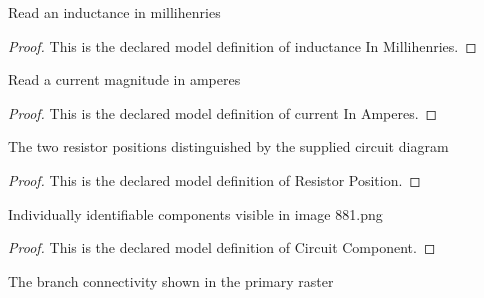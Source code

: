 \begin{definition}
  \label{def:physics:phyx-mini-0881:phyxminiproblems-problemphyxmini0881-inductanceinmillihenries}
  Read an inductance in millihenries
\end{definition}
\begin{proof}
  This is the declared model definition of inductance In Millihenries.
\end{proof}
\begin{definition}
  \label{def:physics:phyx-mini-0881:phyxminiproblems-problemphyxmini0881-currentinamperes}
  Read a current magnitude in amperes
\end{definition}
\begin{proof}
  This is the declared model definition of current In Amperes.
\end{proof}
\begin{definition}
  \label{def:physics:phyx-mini-0881:phyxminiproblems-problemphyxmini0881-resistorposition}
  The two resistor positions distinguished by the supplied circuit diagram
\end{definition}
\begin{proof}
  This is the declared model definition of Resistor Position.
\end{proof}
\begin{definition}
  \label{def:physics:phyx-mini-0881:phyxminiproblems-problemphyxmini0881-circuitcomponent}
  Individually identifiable components visible in image 881.png
\end{definition}
\begin{proof}
  This is the declared model definition of Circuit Component.
\end{proof}
\begin{definition}
  \label{def:physics:phyx-mini-0881:phyxminiproblems-problemphyxmini0881-circuittopology}
  The branch connectivity shown in the primary raster
\end{definition}
